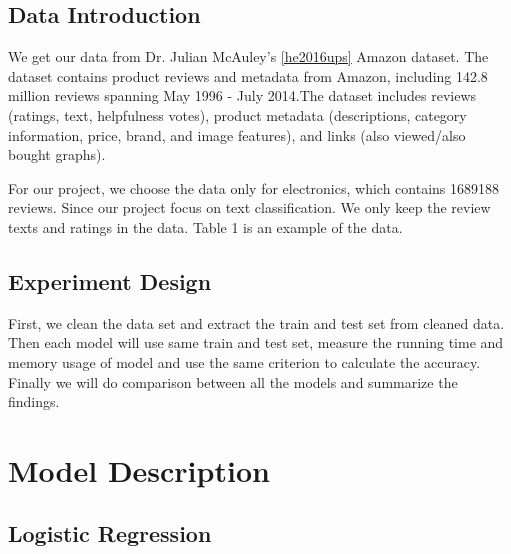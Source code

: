 \documentclass[letterpaper]{article} %
\begin{document}
\subsection{Data Introduction}
We get our data from Dr. Julian McAuley's \ref{he2016ups} Amazon dataset. The dataset contains product reviews and metadata from Amazon, including 142.8 million reviews spanning May 1996 - July 2014.The dataset includes reviews (ratings, text, helpfulness votes), product metadata (descriptions, category information, price, brand, and image features), and links (also viewed/also bought graphs). \par
For our project, we choose the data only for electronics, which contains 1689188 reviews. Since our project focus on text classification. We only keep the review texts and ratings in the data. Table 1 is an example of the data.\par
\begin{table}[htb]
\caption{Example of Amazon Review Data} %
\end{table}

\subsection{Experiment Design}

First, we clean the data set and extract the train and test set from cleaned data. Then each model will use same train and test set, measure the running time and memory usage of model and use the same criterion to calculate the accuracy. Finally we will do comparison between all the models and summarize the findings.

\section{Model Description}

\subsection{Logistic Regression}
\end{document}

